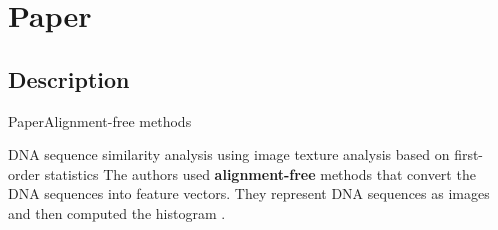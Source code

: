 \documentclass[10pt]{beamer}
\newcommand{\1}{
	\setbeamertemplate{background}{
		\texttt{[image: img/1\_dna]}
		\tikz[overlay] \fill[fill opacity=0.75,fill=white] (0,0) rectangle (-\paperwidth,\paperheight);
	}
}
\begin{document}


\section{Paper}

\subsection{Description}

\begin{frame}{Paper}{Alignment-free methods}
	\begin{block}{DNA sequence similarity analysis using image texture analysis based	on first-order statistics}
		The authors used \textbf{alignment-free} methods that convert the DNA sequences into feature vectors. They represent DNA sequences as images and then computed the histogram \cite{delibacs2020dna}. 
	\end{block}
\end{frame}
\end{document}
